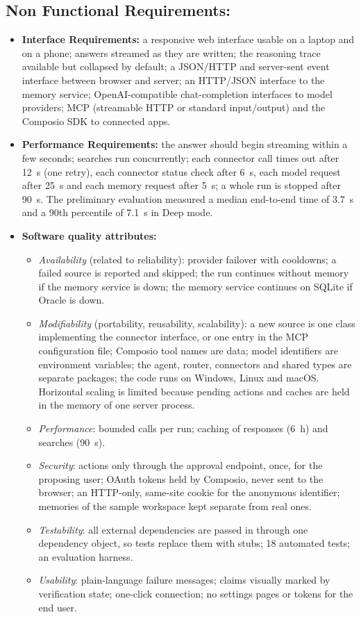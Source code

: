 \documentclass[oneside,a4paper,12pt]{report}
\begin{document}
\subsection{Non Functional Requirements:}
\begin{itemize}
	\item	\textbf{Interface Requirements:} a responsive web interface usable on a laptop and on a phone; answers streamed as they are written; the reasoning trace available but collapsed by default; a JSON/HTTP and server-sent event interface between browser and server; an HTTP/JSON interface to the memory service; OpenAI-compatible chat-completion interfaces to model providers; MCP (streamable HTTP or standard input/output) and the Composio SDK to connected apps.
	\item	\textbf{Performance Requirements:} the answer should begin streaming within a few seconds; searches run concurrently; each connector call times out after 12~s (one retry), each connector status check after 6~s, each model request after 25~s and each memory request after 5~s; a whole run is stopped after 90~s. The preliminary evaluation measured a median end-to-end time of 3.7~s and a 90th percentile of 7.1~s in Deep mode.
    \item	\textbf{Software quality attributes:}
    \begin{itemize}
    \item \emph{Availability} (related to reliability): provider failover with cooldowns; a failed source is reported and skipped; the run continues without memory if the memory service is down; the memory service continues on SQLite if Oracle is down.
    \item \emph{Modifiability} (portability, reusability, scalability): a new source is one class implementing the connector interface, or one entry in the MCP configuration file; Composio tool names are data; model identifiers are environment variables; the agent, router, connectors and shared types are separate packages; the code runs on Windows, Linux and macOS. Horizontal scaling is limited because pending actions and caches are held in the memory of one server process.
    \item \emph{Performance}: bounded calls per run; caching of responses (6~h) and searches (90~s).
    \item \emph{Security}: actions only through the approval endpoint, once, for the proposing user; OAuth tokens held by Composio, never sent to the browser; an HTTP-only, same-site cookie for the anonymous identifier; memories of the sample workspace kept separate from real ones.
    \item \emph{Testability}: all external dependencies are passed in through one dependency object, so tests replace them with stubs; 18 automated tests; an evaluation harness.
    \item \emph{Usability}: plain-language failure messages; claims visually marked by verification state; one-click connection; no settings pages or tokens for the end user.
    \end{itemize}
\end{itemize}
\end{document}
